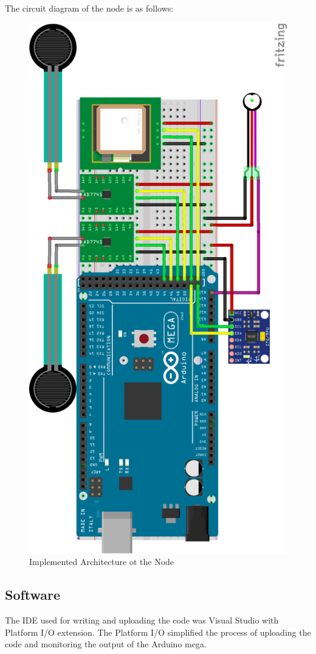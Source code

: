 		The circuit diagram of the node is as follows:

		\begin{figure}[h]
			\centering
			\includegraphics[width=0.8\linewidth]{gfx/node_diagram}
			\caption{Implemented Architecture ot the Node}
			\label{fig:architecture_node}
		\end{figure}

	\subsection{Software}
		The IDE used for writing and uploading the code was Visual Studio with Platform I/O extension. The Platform I/O simplified the process of uploading the code and monitoring the output of the Arduino mega.

